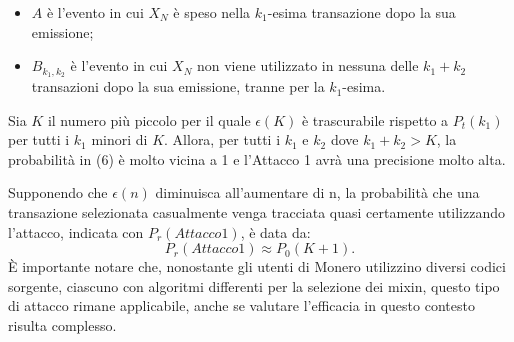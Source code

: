 \begin{itemize}
    \item \( A \) è l'evento in cui \( X_N \) è speso nella \( k_1 \)-esima transazione dopo la sua emissione;
    \item \( B_{k_1,k_2} \) è l'evento in cui \( X_N \) non viene utilizzato in nessuna delle \( k_1 + k_2 \) transazioni dopo la sua emissione, tranne per la \( k_1 \)-esima.
\end{itemize}

Sia \( K \) il numero più piccolo per il quale \( \epsilon(K) \) è trascurabile rispetto a \( P_t(k_1) \) per tutti i \( k_1 \) minori di \( K \). Allora, per tutti i \( k_1 \) e \( k_2 \) dove \( k_1 + k_2 > K \), la probabilità in (6) è molto vicina a 1 e l'Attacco 1 avrà una precisione molto alta.

Supponendo che $\epsilon(n)$ diminuisca all'aumentare di n, la probabilità che una transazione selezionata casualmente venga tracciata quasi certamente utilizzando l'attacco, indicata con $P_{r}(Attacco 1)$, è data da:
\begin{equation}
    P_{r}(Attacco 1) \approx P_{0}(K+1).
\end{equation}
È importante notare che, nonostante gli utenti di Monero utilizzino diversi codici sorgente, ciascuno con algoritmi differenti per la selezione dei mixin, questo tipo di attacco rimane applicabile, anche se valutare l'efficacia in questo contesto risulta complesso.
